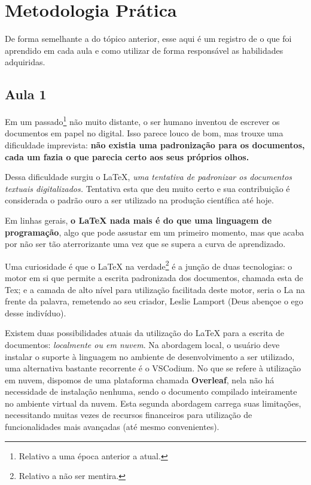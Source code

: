 \documentclass[12pt, a4paper, twocolumn] {article} %
\begin{document}
\section{Metodologia Prática}
De forma semelhante a do tópico anterior, esse aqui é um registro de o que foi aprendido em cada aula e como utilizar de forma responsável as habilidades adquiridas.

\subsection{Aula 1}
Em um passado\footnote{Relativo a uma época anterior a atual.} não muito distante, o ser humano inventou de escrever os documentos em papel no digital. Isso parece louco de bom, mas trouxe uma dificuldade imprevista: \textbf{não existia uma padronização para os documentos, cada um fazia o que parecia certo aos seus próprios olhos.}


Dessa dificuldade surgiu o LaTeX, \textit{uma tentativa de padronizar os documentos textuais digitalizados.} Tentativa esta que deu muito certo e sua contribuição é considerada o padrão ouro a ser utilizado na produção científica até hoje.


Em linhas gerais, \textbf{o LaTeX nada mais é do que uma linguagem de programação}, algo que pode assustar em um primeiro momento, mas que acaba por não ser tão aterrorizante uma vez que se supera a curva de aprendizado. 


Uma curiosidade é que o LaTeX na verdade\footnote{Relativo a não ser mentira.} é a junção de duas tecnologias: o motor em si que permite a escrita padronizada dos documentos, chamada esta de Tex; e a camada de alto nível para utilização facilitada deste motor, seria o La na frente da palavra, remetendo ao seu criador, Leslie Lamport (Deus abençoe o ego desse indivíduo).


Existem duas possibilidades atuais da utilização do LaTeX para a escrita de documentos: \textit{localmente ou em nuvem}. Na abordagem local, o usuário deve instalar o suporte à linguagem no ambiente de desenvolvimento a ser utilizado, uma alternativa bastante recorrente é o VSCodium. No que se refere à utilização em nuvem, dispomos de uma plataforma chamada \textbf{Overleaf}, nela não há necessidade de instalação nenhuma, sendo o documento compilado inteiramente no ambiente virtual da nuvem. Esta segunda abordagem carrega suas limitações, necessitando muitas vezes de recursos financeiros para utilização de funcionalidades mais avançadas (até mesmo convenientes).
\end{document}
